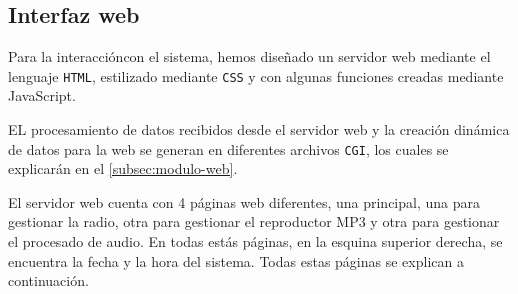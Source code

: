 \subsection{Interfaz web}
Para la interaccióncon el sistema, hemos diseñado un servidor web mediante el lenguaje \texttt{HTML}, estilizado mediante \texttt{CSS} y con algunas funciones creadas mediante JavaScript.

EL procesamiento de datos recibidos desde el servidor web y la creación dinámica de datos para la web se generan en diferentes archivos \texttt{CGI}, los cuales se explicarán en el \autoref{subsec:modulo-web}.

El servidor web cuenta con 4 páginas web diferentes, una principal, una para gestionar la radio, otra para gestionar el reproductor MP3 y otra para gestionar el procesado de audio. En todas estás páginas, en la esquina superior derecha, se encuentra la fecha y la hora del sistema. Todas estas páginas se explican a continuación.